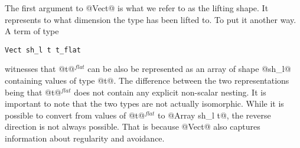The first argument to @Vect@ is what we refer to as the lifting shape. It represents to what dimension the type has been lifted to. To put it another way. A term of type
%
\begin{lstlisting}[style=ndp]
Vect sh_l t t_flat
\end{lstlisting}
%
witnesses that @t@$^{\textit{flat}}$ can be also be represented as an array of shape @sh_l@ containing values of type @t@. The difference between the two representations being that @t@$^{\textit{flat}}$ does not contain any explicit non-scalar nesting. It is important to note that the two types are not actually isomorphic. While it is possible to convert from values of @t@$^{\textit{flat}}$ to @Array sh_l  t@, the reverse direction is not always possible. That is because @Vect@ also captures information about regularity and avoidance.

